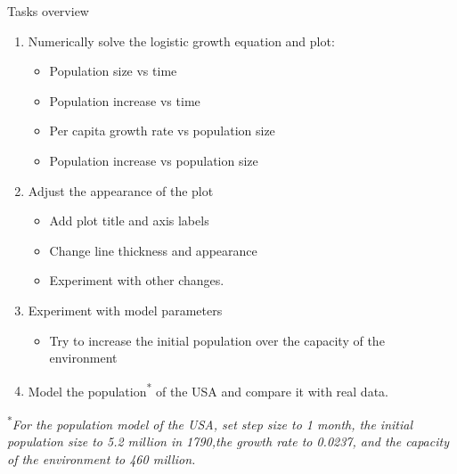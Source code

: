 \begin{frame}{Tasks overview}
\footnotesize
\begin{enumerate}
    \item Numerically solve the logistic growth equation and plot:
    \begin{itemize}
    \footnotesize
        \item Population size vs time
        \item Population increase vs time
        \item Per capita growth rate vs population size
        \item Population increase vs population size
    \end{itemize}
    \pause
    \item Adjust the appearance of the plot
    \begin{itemize}
    \footnotesize
        \item Add plot title and axis labels 
        \item Change line thickness and appearance
        \item Experiment with other changes.
    \end{itemize}
    \pause
    \item Experiment with model parameters
        \begin{itemize}
        \footnotesize
            \item Try to increase the initial population over the capacity of the environment
        \end{itemize}
    \item Model the population\textsuperscript{*} of the USA and compare it with real data.
\end{enumerate}

\tiny
\textsuperscript{*}\textit{For the population model of the USA, set step size to 1 month, the initial population size to 5.2 million in 1790,the growth rate to 0.0237, and the capacity of the environment to 460 million.}
\end{frame}

